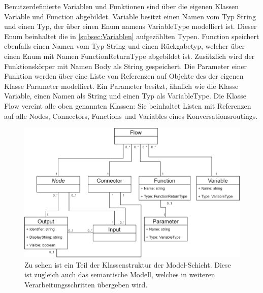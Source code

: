 \newline
Benutzerdefinierte Variablen und Funktionen sind über die eigenen Klassen Variable und Function abgebildet. Variable besitzt einen Namen vom Typ String und einen Typ, der über einen Enum namens VariableType modelliert ist. Dieser Enum beinhaltet die in \ref{subsec:Variablen} aufgezählten Typen. Function speichert ebenfalls einen Namen vom Typ String und einen Rückgabetyp, welcher über einen Enum mit Namen FunctionReturnType abgebildet ist. Zusätzlich wird der Funktionskörper mit Namen Body als String gespeichert. Die Parameter einer Funktion werden über eine Liste von Referenzen auf Objekte des der eigenen Klasse Parameter modelliert. Ein Parameter besitzt, ähnlich wie die Klasse Variable, einen Namen als String und einen Typ als VariableType. Die Klasse Flow vereint alle oben genannten Klassen: Sie beinhaltet Listen mit Referenzen auf alle Nodes, Connectors, Functions und Variables eines Konversationsroutings. 

\begin{figure} %
	\centering
		\includegraphics[width=\textwidth]{img/FlowClassStructure.png}
	\caption[Klassenstruktur der Model-Schicht]{Zu sehen ist ein Teil der Klassenstruktur der Model-Schicht. Diese ist zugleich auch das semantische Modell, welches in weiteren Verarbeitungsschritten übergeben wird.}
	\label{fig:UML:Model-Schicht}
\end{figure}

